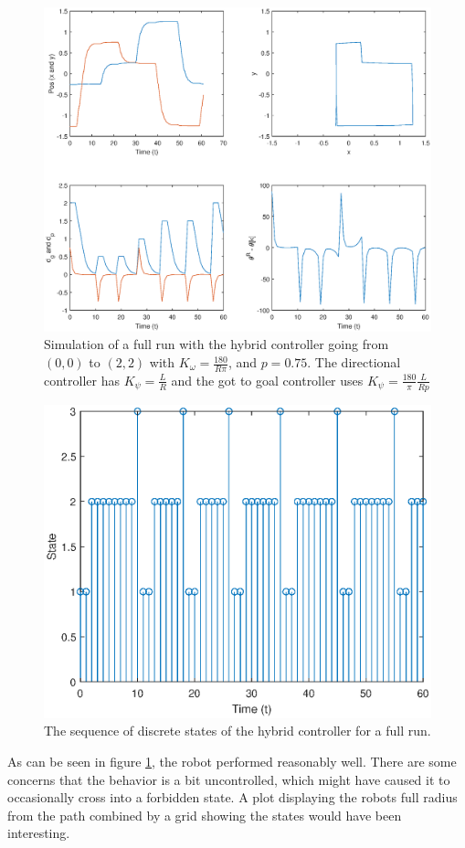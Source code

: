 \begin{figure}[H]
    \centering
    \includegraphics[width=\textwidth]{figs/perf-fullrun.eps}
    \caption{Simulation of a full run with the hybrid controller going from $(0, 0)$ to $(2, 2)$ with $K_\omega = \frac{180}{R\pi}$, and $p = 0.75.$ The directional controller has $K_\psi = \frac{L}{R}$ and the got to goal controller uses $K_\psi = \frac{180}{\pi} \frac{L}{Rp}$} \label{fig:perf-full}
\end{figure}

\begin{figure}[H]
    \centering
    \includegraphics[width=\textwidth]{figs/states-full.eps}
    \caption{The sequence of discrete states of the hybrid controller for a full run. } \label{fig:states-full}
\end{figure}

As can be seen in figure \ref{fig:perf-full}, the robot performed reasonably well. There are some concerns that the behavior is a bit uncontrolled, which might have caused it to occasionally cross into a forbidden state. A plot displaying the robots full radius from the path combined by a grid showing the states would have been interesting.

